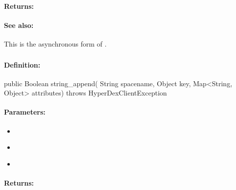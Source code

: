\paragraph{Returns:}


\paragraph{See also:}  This is the asynchronous form of .

\pagebreak
\subsubsection{}
\label{api:java:string_append}


\paragraph{Definition:}
\begin{javacode}
public Boolean string_append(
        String spacename,
        Object key,
        Map<String, Object> attributes) throws HyperDexClientException
\end{javacode}

\paragraph{Parameters:}
\begin{itemize}[noitemsep]
\item {}\\

\item {}\\

\item {}\\

\end{itemize}

\paragraph{Returns:}


